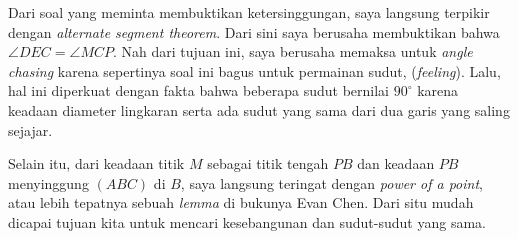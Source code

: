 
\newline

\begin{motivasi}
    Dari soal yang meminta membuktikan ketersinggungan, saya langsung terpikir dengan \textit{alternate segment theorem}. Dari sini saya berusaha membuktikan bahwa $\angle DEC = \angle MCP$. Nah dari tujuan ini, saya berusaha memaksa untuk \textit{angle chasing} karena sepertinya soal ini bagus untuk permainan sudut, (\textit{feeling}). Lalu, hal ini diperkuat dengan fakta bahwa beberapa sudut bernilai $90^\circ$ karena keadaan diameter lingkaran serta ada sudut yang sama dari dua garis yang saling sejajar. 

    Selain itu, dari keadaan titik $M$ sebagai titik tengah $PB$ dan keadaan $PB$ menyinggung $(ABC)$ di $B$, saya langsung teringat dengan \textit{power of a point}, atau lebih tepatnya sebuah \textit{lemma} di bukunya Evan Chen. Dari situ mudah dicapai tujuan kita untuk mencari kesebangunan dan sudut-sudut yang sama.
\end{motivasi}
